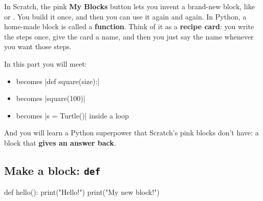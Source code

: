 
In Scratch, the pink \textbf{My Blocks} button lets you invent a brand-new block, like  or . You build it once, and then you can use it again and again. In Python, a home-made block is called a \textbf{function}. Think of it as a \textbf{recipe card}: you write the steps once, give the card a name, and then you just say the name whenever you want those steps.

In this part you will meet:
\begin{itemize}
  \item {} \quad becomes \quad \py|def square(size):|
  \item {} \quad becomes \quad \py|square(100)|
  \item {} \quad becomes \quad \py|s = Turtle()| inside a loop
\end{itemize}

And you will learn a Python superpower that Scratch's pink blocks don't have: a block that \textbf{gives an answer back}.


\subsection*{Make a block: \texttt{def}}

\begin{tcbraster}[raster columns=2, raster equal height=rows, raster column skip=12pt, raster valign=center, raster force size=false, raster column 1/.style={add to width=-2cm}, raster column 2/.style={add to width=2cm}]
\begin{tcolorbox}[colback=white, colframe=white, boxrule=0pt, valign=center]
\begin{scratch}
\end{scratch}
\end{tcolorbox}
\begin{code}
def hello():
    print("Hello!")
    print("My new block!")
\end{code}
\end{tcbraster}

